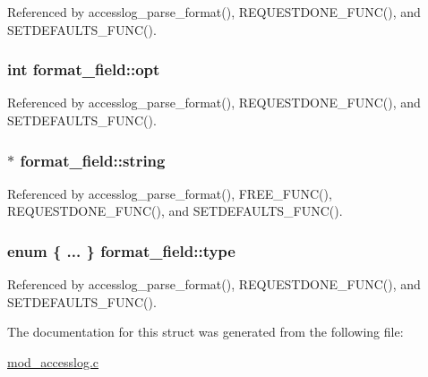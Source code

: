 Referenced by accesslog\-\_\-parse\-\_\-format(), R\-E\-Q\-U\-E\-S\-T\-D\-O\-N\-E\-\_\-\-F\-U\-N\-C(), and S\-E\-T\-D\-E\-F\-A\-U\-L\-T\-S\-\_\-\-F\-U\-N\-C().

\hypertarget{structformat__field_ad793744ac1aad9995e3f2c8c9b6165bc}{
\subsubsection[{opt}]{\setlength{\rightskip}{0pt plus 5cm}int format\-\_\-field\-::opt}}\label{structformat__field_ad793744ac1aad9995e3f2c8c9b6165bc}


Referenced by accesslog\-\_\-parse\-\_\-format(), R\-E\-Q\-U\-E\-S\-T\-D\-O\-N\-E\-\_\-\-F\-U\-N\-C(), and S\-E\-T\-D\-E\-F\-A\-U\-L\-T\-S\-\_\-\-F\-U\-N\-C().

\hypertarget{structformat__field_ae2afec07810d0e06a726b6125d0b8293}{
\subsubsection[{string}]{$\ast$ format\-\_\-field\-::string}}\label{structformat__field_ae2afec07810d0e06a726b6125d0b8293}


Referenced by accesslog\-\_\-parse\-\_\-format(), F\-R\-E\-E\-\_\-\-F\-U\-N\-C(), R\-E\-Q\-U\-E\-S\-T\-D\-O\-N\-E\-\_\-\-F\-U\-N\-C(), and S\-E\-T\-D\-E\-F\-A\-U\-L\-T\-S\-\_\-\-F\-U\-N\-C().

\hypertarget{structformat__field_a64f5fef36457e9025a97f8a7cc847de8}{
\subsubsection[{type}]{\setlength{\rightskip}{0pt plus 5cm}enum \{ ... \}   format\-\_\-field\-::type}}\label{structformat__field_a64f5fef36457e9025a97f8a7cc847de8}


Referenced by accesslog\-\_\-parse\-\_\-format(), R\-E\-Q\-U\-E\-S\-T\-D\-O\-N\-E\-\_\-\-F\-U\-N\-C(), and S\-E\-T\-D\-E\-F\-A\-U\-L\-T\-S\-\_\-\-F\-U\-N\-C().



The documentation for this struct was generated from the following file\-:\begin{DoxyCompactItemize}
\item 
\hyperlink{mod__accesslog_8c}{mod\-\_\-accesslog.\-c}\end{DoxyCompactItemize}
